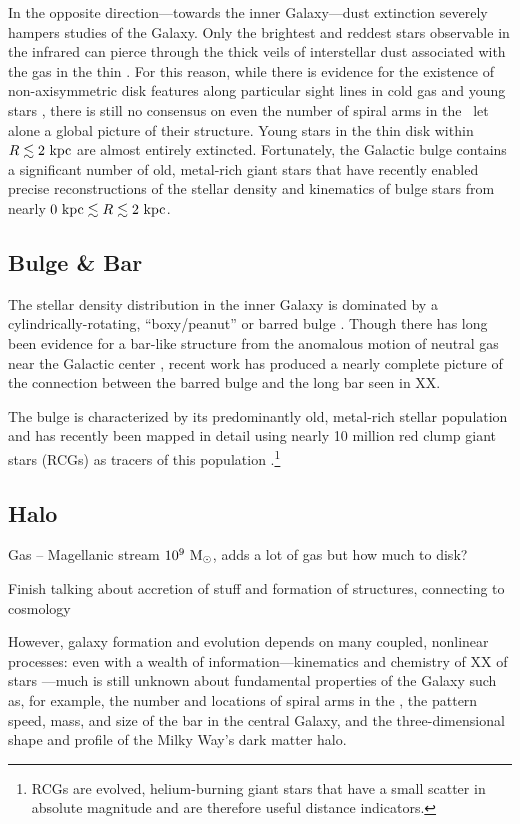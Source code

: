In the opposite direction---towards the inner Galaxy---dust extinction severely hampers studies of the Galaxy. Only the brightest and reddest stars observable in the infrared can pierce through the thick veils of interstellar dust associated with the gas in the thin \mwdisk. For this reason, while there is evidence for the existence of non-axisymmetric disk features along particular sight lines in cold gas \citep{todo} and young stars \citep[cepheids;][]{todo}, there is still no consensus on even the number of spiral arms in the \mwdisk\ let alone a global picture of their structure. Young stars in the thin disk within $R \lesssim 2~\mathrm{kpc}$ are almost entirely extincted. Fortunately, the Galactic bulge contains a significant number of old, metal-rich giant stars that have recently enabled precise reconstructions of the stellar density and kinematics of bulge stars from nearly $0~\mathrm{kpc} \lesssim R \lesssim 2~\mathrm{kpc}$.

\subsection{Bulge \& Bar}

The stellar density distribution in the inner Galaxy is dominated by a cylindrically-rotating, ``boxy/peanut'' or barred bulge \citep{blitz91, weiland94, binney97}. Though there has long been evidence for a bar-like structure from the anomalous motion of neutral gas near the Galactic center \citep{binney91}, recent work has produced a nearly complete picture of the connection between the barred bulge and the long bar seen in XX. 

The bulge is characterized by its predominantly old, metal-rich stellar population and has recently been mapped in detail using nearly 10 million red clump giant stars (RCGs) as tracers of this population \citep{wegg13}.\footnote{RCGs are evolved, helium-burning giant stars that have a small scatter in absolute magnitude and are therefore useful distance indicators.} 


\subsection{Halo} 

Gas -- Magellanic stream $10^9~\mathrm{M}_\odot$, adds a lot of gas but how much to disk?

Finish talking about accretion of stuff and formation of structures, connecting to cosmology


However, galaxy formation and evolution depends on many coupled, nonlinear processes: even with a wealth of information---kinematics and chemistry of XX of stars \citep{todo}---much is still unknown about fundamental properties of the Galaxy such as, for example, the number and locations of spiral arms in the \mwdisk, the pattern speed, mass, and size of the bar in the central Galaxy, and the three-dimensional shape and profile of the Milky Way's dark matter halo. 

